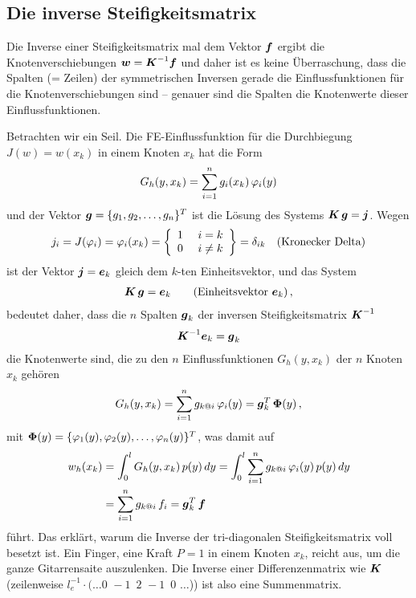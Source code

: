 {\textcolor{sectionTitleBlue}{\section{Die inverse Steifigkeitsmatrix}}}
Die Inverse einer Steifigkeitsmatrix mal dem Vektor $\vek f $ ergibt die Knotenverschiebungen $\vek w = \vek K^{-1}\vek f$ und daher ist es keine \"{U}berraschung, dass die Spalten (= Zeilen) der symmetrischen Inversen gerade die Einflussfunktionen f\"{u}r die Knotenverschiebungen sind -- genauer sind die Spalten die Knotenwerte dieser Einflussfunktionen.

Betrachten wir ein Seil. Die FE-Einflussfunktion f\"{u}r die Durchbiegung $J(w) = w(x_k)$ in einem Knoten $x_k$ hat die Form
\begin{align}
G_h(y,x_k) = \sum_{i=1}^n g_i(x_k)\,\Np_i(y)
\end{align}
und der Vektor $\vek g = \{g_{1},g_{2}, \ldots, g_{n}\}^T $ ist die L\"{o}sung des Systems $\vek K\,\vek g = \vek j$. Wegen
\begin{align}
j_i = J(\Np_i) = \Np_i(x_k) = \left \{ \barr{l l } 1 & \,\, i = k \\  0 & \,\, i \neq k \earr\right \} = \delta_{ik} \quad \text{(Kronecker Delta)}
\end{align}
ist der Vektor $\vek j = \vek e_k$ gleich dem $k$-ten Einheitsvektor, und das System
\begin{align}
\vek K\,\vek g = \vek e_k \qquad \text{(Einheitsvektor $\vek
e_k$)}\,,
\end{align}
bedeutet daher, dass die $n$ Spalten $\vek g_k$ der inversen Steifigkeitsmatrix $\vek K^{-1}$
\begin{align}
\vek K^{-1} \vek e_k = \vek g_k
\end{align}
die Knotenwerte sind, die zu den $n$ Einflussfunktionen $G_h(y, x_k)$ der $n$ Knoten $x_k$ geh\"{o}ren
\begin{align}
 G_h(y,x_k) = \sum_{i=1}^n g_{k @i}\,\Np_i(y)  = \vek g_k^T\,\vek \Phi (y)\,,
\end{align}
mit $\vek \Phi(y) = \{\Np_1(y), \Np_2(y), \ldots, \Np_n(y)\}^T$, was damit auf
\begin{align}
w_h(x_k) &= \int_{0}^{l} G_h(y,x_k)\,p(y)\,dy = \int_{0}^{l}\sum_{i=1}^n g_{k @i}\,\Np_i(y) \,p(y)\,dy\nn \\
 &= \sum_{i=1}^n g_{k @i}\,f_i =  \vek g_k^T\,\vek f
\end{align}
f\"{u}hrt. Das erkl\"{a}rt, warum die Inverse der tri-diagonalen Steifigkeitsmatrix voll be\-setzt ist.
Ein Finger, eine Kraft $P = 1$ in einem Knoten $x_k$, reicht aus, um die ganze Gitarrensaite auszulenken. Die Inverse einer Differenzenmatrix wie $\vek K$ (zeilenweise  $l_e^{-1} \cdot (\ldots 0\,\,-1\,\,\,2\,\,-1\,\,\,0\,\,\ldots$)) ist also eine Summenmatrix.\\

